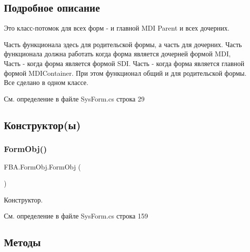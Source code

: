 \subsection{Подробное описание}
Это класс-\/потомок для всех форм -\/ и главной M\+DI Parent и всех дочерних. ~\newline


Часть функционала здесь для родительской формы, а часть для дочерних. Часть функционала должна работать когда форма является дочерней формой M\+DI, Часть -\/ когда форма является формой S\+DI. Часть -\/ когда форма является главной формой M\+D\+I\+Container. При этом функционал общий и для родительской формы. Все сделано в одном классе. ~\newline


См. определение в файле Sys\+Form.\+cs строка 29



\subsection{Конструктор(ы)}
\mbox{\label{class_f_b_a_1_1_form_obj_a9331b48eb6bce47e5e328a8ee6744a1c}} 
\subsubsection{\texorpdfstring{Form\+Obj()}{FormObj()}}
{\footnotesize\ttfamily F\+B\+A.\+Form\+Obj.\+Form\+Obj (\begin{DoxyParamCaption}{ }\end{DoxyParamCaption})}



Конструктор. 



См. определение в файле Sys\+Form.\+cs строка 159



\subsection{Методы}
\mbox{\label{class_f_b_a_1_1_form_obj_a67855cc1f5ca5fda0fa9564a3de101cc}} 
